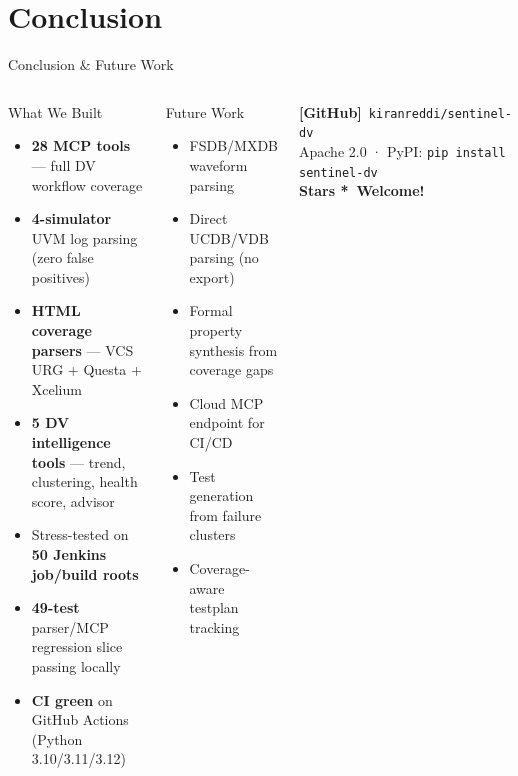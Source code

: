 \documentclass[aspectratio=169,t]{beamer}
\begin{document}
\section{Conclusion}
\begin{frame}{Conclusion \& Future Work}
  \begin{columns}[T]
      \begin{block}{What We Built}
        \begin{itemize}
          \item \textbf{28 MCP tools} — full DV workflow coverage
          \item \textbf{4-simulator} UVM log parsing (zero false positives)
          \item \textbf{HTML coverage parsers} — VCS URG + Questa + Xcelium
          \item \textbf{5 DV intelligence tools} — trend, clustering,
                health score, advisor
          \item Stress-tested on \textbf{50 Jenkins job/build roots}
          \item \textbf{49-test} parser/MCP regression slice passing locally
          \item \textbf{CI green} on GitHub Actions (Python 3.10/3.11/3.12)
        \end{itemize}
      \end{block}

      \begin{alertblock}{Future Work}
        \begin{itemize}
          \item FSDB/MXDB waveform parsing
          \item Direct UCDB/VDB parsing (no export)
          \item Formal property synthesis from coverage gaps
          \item Cloud MCP endpoint for CI/CD
          \item Test generation from failure clusters
          \item Coverage-aware testplan tracking
        \end{itemize}
      \end{alertblock}
      \vspace{0.5em}
      \begin{center}
        \Large\textbf{[GitHub]}\ \texttt{kiranreddi/sentinel-dv}\\[4pt]
        \normalsize Apache 2.0 · PyPI: \texttt{pip install sentinel-dv}\\[4pt]
        \textcolor{sdvgreen}{\textbf{Stars *\ Welcome!}}
      \end{center}
  \end{columns}
\end{frame}
\end{document}
